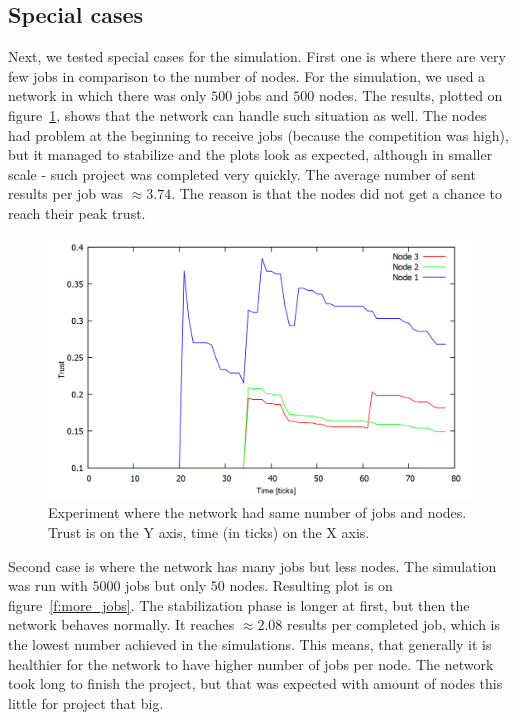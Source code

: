 \FloatBarrier

\subsection{Special cases}

Next, we tested special cases for the simulation. First one is where there are very few jobs in comparison to the number of nodes. For the simulation, we used a network in which there was only $500$ jobs and $500$ nodes. The results, plotted on figure~\ref{f:less_jobs}, shows that the network can handle such situation as well. The nodes had problem at the beginning to receive jobs (because the competition was high), but it managed to stabilize and the plots look as expected, although in smaller scale - such project was completed very quickly. The average number of sent results per job was $\approx 3.74$. The reason is that the nodes did not get a chance to reach their peak trust.

\begin{figure}
\centering
\includegraphics[width=\textwidth]{diagrams/trust_less_jobs.png}
\caption{Experiment where the network had same number of jobs and nodes. Trust is on the Y axis, time (in ticks) on the X axis.}
\label{f:less_jobs}
\end{figure}

Second case is where the network has many jobs but less nodes. The simulation was run with $5000$ jobs but only $50$ nodes. Resulting plot is on figure~\ref{f:more_jobs}. The stabilization phase is longer at first, but then the network behaves normally. It reaches $\approx 2.08$ results per completed job, which is the lowest number achieved in the simulations. This means, that generally it is healthier for the network to have higher number of jobs per node. The network took long to finish the project, but that was expected with amount of nodes this little for project that big.

